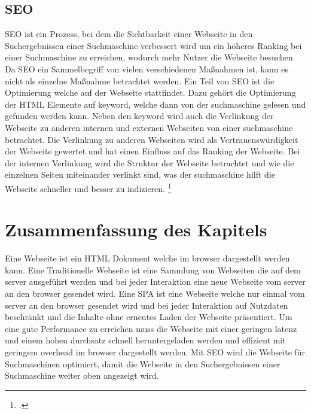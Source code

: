 \subsection{\ac{SEO}}
\ac{SEO} ist ein Prozess, bei dem die Sichtbarkeit einer Webseite in den Suchergebnissen einer Suchmaschine verbessert wird um ein höheres Ranking bei einer Suchmaschine zu erreichen,
wodurch mehr Nutzer die Webseite besuchen.
Da \ac{SEO} ein Sammelbegriff von vielen verschiedenen Maßnahmen ist, kann es nicht als einzelne Maßnahme betrachtet werden.
Ein Teil von \ac{SEO} ist die Optimierung welche auf der Webseite stattfindet.
Dazu gehört die Optimierung der \ac{HTML} Elemente auf \gls{keyword}, welche dann von der \gls{suchmaschine} gelesen und gefunden werden kann.
Neben den \gls{keyword} wird auch die Verlinkung der Webseite zu anderen internen und externen Webseiten von einer \gls{suchmaschine} betrachtet.
Die Verlinkung zu anderen Webseiten wird als Vertrauenswürdigkeit der Webseite gewertet und hat einen Einfluss auf das Ranking der Webseite.
Bei der internen Verlinkung wird die Struktur der Webseite betrachtet und wie die einzelnen Seiten miteinander verlinkt sind, was der \gls{suchmaschine} hilft die Webseite schneller und besser zu indizieren.
\footcite[Vgl.][Seite 5]{John2016}

\section*{Zusammenfassung des Kapitels}
Eine Webseite ist ein \ac{HTML} Dokument welche im \gls{browser} dargestellt werden kann.
Eine Traditionelle Webseite ist eine Sammlung von Webseiten die auf dem \gls{server} ausgeführt werden und bei jeder Interaktion eine neue Webseite vom \gls{server} an den \gls{browser} gesendet wird.
Eine \ac{SPA} ist eine Webseite welche nur einmal vom \gls{server} an den \gls{browser} gesendet wird und bei jeder Interaktion auf Nutzdaten beschränkt und die Inhalte ohne erneutes Laden der Webseite präsentiert.
Um eine gute Performance zu erreichen muss die Webseite mit einer geringen \gls{latenz} und einem hohen \gls{durchsatz} schnell heruntergeladen werden
und effizient mit geringem \gls{overhead} im \gls{browser} dargestellt werden.
Mit \ac{SEO} wird die Webseite für Suchmaschinen optimiert, damit die Webseite in den Suchergebnissen einer Suchmaschine weiter oben angezeigt wird.
